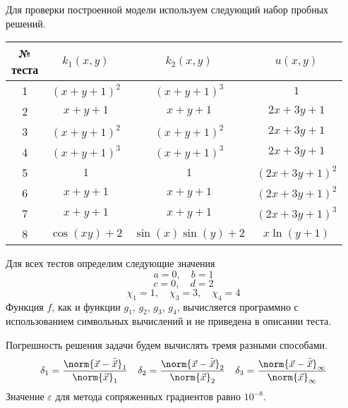 Для проверки построенной модели используем следующий набор пробных решений.
\begin{table}[H]
    \centering
    \begin{tabular}{*4c}
        \toprule
        \makecell{№\\теста} & $k_1(x, y)$ & $k_2(x, y)$ & $u(x, y)$ \\
        \midrule
        1 & $(x + y + 1)^2$ & $(x + y + 1)^3$ & $1$ \\
        2 & $x + y + 1$ & $x + y + 1$ & $2 x + 3 y + 1$ \\
        3 & $(x + y + 1)^2$ & $(x + y + 1)^2$ & $2 x + 3 y + 1$ \\
        4 & $(x + y + 1)^3$ & $(x + y + 1)^3$ & $2 x + 3 y + 1$ \\
        5 & $1$ & $1$ & $(2 x + 3 y + 1)^2$ \\
        6 & $x + y + 1$ & $x + y + 1$ & $(2 x + 3 y + 1)^2$ \\
        7 & $x + y + 1$ & $x + y + 1$ & $(2 x + 3 y + 1)^3$ \\
        8 & $\cos(x y) + 2$ & $\sin(x)\sin(y) + 2$ & $x \ln(y + 1)$ \\
        \bottomrule
    \end{tabular}
\end{table}
Для всех тестов определим следующие значения
\[ a = 0,\quad b = 1 \]
\[ c = 0,\quad d = 2 \]
\[ \chi_1 = 1,\quad \chi_3 = 3,\quad \chi_4 = 4 \]
Функция $f$, как и функции $g_1$, $g_2$, $g_3$, $g_4$, вычисляется программно с
использованием символьных вычислений и не приведена в описании теста.

Погрешность решения задачи будем вычислять тремя разными способами.
\begin{align*}
    \delta_1 &= \frac{\norm{\vec{x} - \tilde{\vec{x}}}_1}{\norm{\vec{x}}_1} &
    \delta_2 &= \frac{\norm{\vec{x} - \tilde{\vec{x}}}_2}{\norm{\vec{x}}_2} &
    \delta_3 &= \frac{\norm{\vec{x} - \tilde{\vec{x}}}_{\infty}}{\norm{\vec{x}}_{\infty}} \\
\end{align*}
Значение $\varepsilon$ для метода сопряженных градиентов равно $10^{-8}$.

